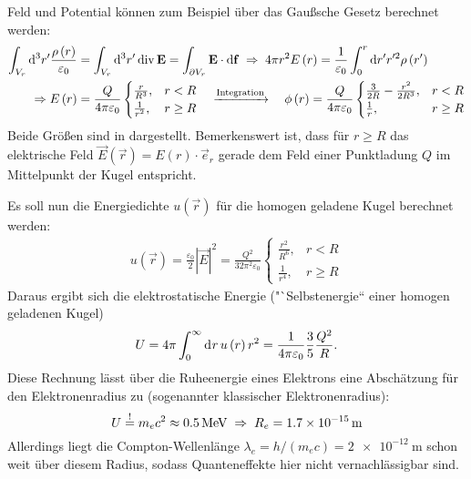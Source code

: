 Feld und Potential können zum Beispiel über das Gaußsche Gesetz berechnet werden:
\begin{align*}
	\int _{{V_{r}}}\mathop{}\!\mathrm{d} ^{3}r'\frac{\rho \left(r\right)}{\varepsilon _{0}} & =\int _{{V_{r}}}\mathop{}\!\mathrm{d} ^{3}r'\operatorname{div} \mathbf{E}=\int _{\partial {V_{r}}}\mathbf{E}\cdot \mathop{}\!\mathrm{d} \mathbf{f}\;\Rightarrow\; 4\pi r^{2}E\left(r\right)=\frac{1}{\varepsilon _{0}}\int _{0}^{r}\mathop{}\!\mathrm{d} r'r'^{2}\rho \left(r'\right) \\
	\Rightarrow E\left(r\right)                                             & =\frac{Q}{4\pi \varepsilon _{0}}
	\begin{cases} \frac{r}{R^{3}}, & r<R     \\
              \frac{1}{r^{2}}, & r\geq R
	\end{cases} \quad\xrightarrow{\text{Integration}}\quad \phi \left(r\right)=\frac{Q}{4\pi \varepsilon _{0}}
	\begin{cases} \frac{3}{2R}-\frac{r^{2}}{2R^{3}}, & r<R     \\
              \frac{1}{r},                       & r\geq R
	\end{cases}
\end{align*}
Beide Größen sind in  dargestellt. Bemerkenswert ist, dass für $r\geq R$ das elektrische Feld $\vec {E}\left(\vec {r}\right)=E\left(r\right)\cdot \vec {e}_{r}$ gerade dem Feld einer Punktladung $Q$ im Mittelpunkt der Kugel entspricht.

Es soll nun die Energiedichte $u\left(\vec {r}\right)$ für die homogen geladene Kugel berechnet werden:
\begin{align*}
	u\left(\vec {r}\right)=\frac{\varepsilon _{0}}{2}\left| \vec {E}\right| ^{2}=\frac{Q^{2}}{32\pi ^{2}\varepsilon _{0}}\begin{cases} \frac{r^{2}}{R^{6}}, & r<R     \\
              \frac{1}{r^{4}},     & r\geq R
	                                                                                                                     \end{cases}
\end{align*}
Daraus ergibt sich die elektrostatische Energie ("`Selbstenergie`` einer homogen geladenen Kugel)
\begin{equation*}
	U=4\pi \int _{0}^{\infty }\mathop{\mathrm{d}^{}r}u\left(r\right)r^{2}=\frac{1}{4\pi \varepsilon _{0}}\frac{3}{5}\frac{Q^{2}}{R}.
\end{equation*}
Diese Rechnung lässt über die Ruheenergie eines Elektrons eine Abschätzung für den Elektronenradius zu (sogenannter klassischer Elektronenradius):
\begin{equation*}
	U\overset{!}{=} m_{e}c^{2}\approx \SI{0.5}{\mega\eV}\implication R_{e}= \SI{1,7e-15}{\m}
\end{equation*}
Allerdings liegt die Compton-Wellenlänge $\lambda _{e}=h/({m_{e}c})=\SI{2e-12}{\m}$ schon weit über diesem Radius, sodass Quanteneffekte hier nicht vernachlässigbar sind.



